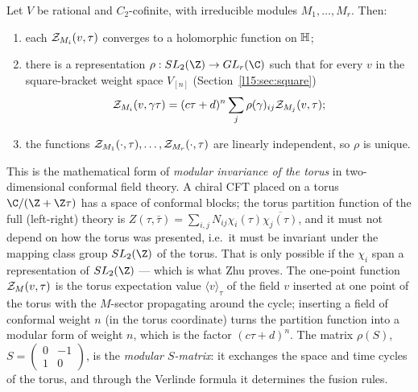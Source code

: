 \begin{theorem}\label{l15:thm:lit}
Let $V$ be rational and $C_2$-cofinite, with irreducible modules $M_1,\dots,M_r$. Then:
\begin{enumerate}
\item each $\mathcal{Z}_{M_i}(v,\tau)$ converges to a holomorphic function on $\mathbb{H}$;
\item there is a representation $\rho:\lfifteenSL\to GL_r(\C)$ such that for every $v$ in the square-bracket weight space
  $V_{[n]}$ (Section~\ref{l15:sec:square})
  \begin{equation*}
  \mathcal{Z}_{M_i}(v,\gamma\tau)=(c\tau+d)^n\sum_{j}\rho(\gamma)_{ij}\mathcal{Z}_{M_j}(v,\tau);
  \end{equation*}
\item the functions $\mathcal{Z}_{M_1}(\cdot,\tau),\dots,\mathcal{Z}_{M_r}(\cdot,\tau)$ are linearly independent, so $\rho$ is
  unique.
\end{enumerate}
\end{theorem}

\begin{physics}
This is the mathematical form of \emph{modular invariance of the torus} in two-dimensional conformal field theory.
A chiral CFT placed on a torus $\C/(\Z+\Z\tau)$ has a space of conformal blocks; the torus partition function of the
full (left-right) theory is $Z(\tau,\bar\tau)=\sum_{i,j}N_{ij}\chi_i(\tau)\overline{\chi_j(\tau)}$, and it must not depend
on how the torus was presented, i.e.\ it must be invariant under the mapping class group $\lfifteenSL$ of the torus.
That is only possible if the $\chi_i$ span a representation of $\lfifteenSL$ --- which is what Zhu proves. The one-point
function $\mathcal{Z}_M(v,\tau)$ is the torus expectation value $\langle v\rangle_\tau$ of the field $v$ inserted at one point
of the torus with the $M$-sector propagating around the cycle; inserting a field of conformal weight $n$ (in the
torus coordinate) turns the partition function into a modular form of weight $n$, which is the factor $(c\tau+d)^n$.
The matrix $\rho(S)$, $S=\left(\begin{smallmatrix}0&-1\\1&0\end{smallmatrix}\right)$, is the \emph{modular $S$-matrix}: it
exchanges the space and time cycles of the torus, and through the Verlinde formula it determines the fusion rules.
\end{physics}

